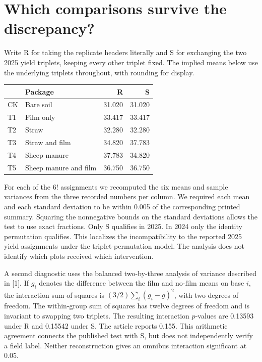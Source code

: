 \documentclass[11pt]{article}
\begin{document}
\newpage
\section{Which comparisons survive the discrepancy?}
Write R for taking the replicate headers literally and S for exchanging the two 2025 yield triplets, keeping every other triplet fixed. The implied means below use the underlying triplets throughout, with rounding for display.
\begin{center}
\begin{tabular}{llrr}\toprule
 & Package & R & S\\ \midrule
CK & Bare soil &31.020&31.020\\
T1 & Film only &33.417&33.417\\
T2 & Straw &32.280&32.280\\
T3 & Straw and film &34.820&37.783\\
T4 & Sheep manure &37.783&34.820\\
T5 & Sheep manure and film &36.750&36.750\\ \bottomrule
\end{tabular}
\end{center}
For each of the $6!$ assignments we recomputed the six means and sample variances from the three recorded numbers per column. We required each mean and each standard deviation to be within 0.005 of the corresponding printed summary. Squaring the nonnegative bounds on the standard deviations allows the test to use exact fractions. Only S qualifies in 2025. In 2024 only the identity permutation qualifies. This localizes the incompatibility to the reported 2025 yield assignments under the triplet-permutation model. The analysis does not identify which plots received which intervention.

A second diagnostic uses the balanced two-by-three analysis of variance described in [1]. If $g_i$ denotes the difference between the film and no-film means on base $i$, the interaction sum of squares is $(3/2)\sum_i(g_i-\bar g)^2$, with two degrees of freedom. The within-group sum of squares has twelve degrees of freedom and is invariant to swapping two triplets. The resulting interaction $p$-values are 0.13593 under R and 0.15542 under S. The article reports 0.155. This arithmetic agreement connects the published test with S, but does not independently verify a field label. Neither reconstruction gives an omnibus interaction significant at 0.05.
\end{document}
